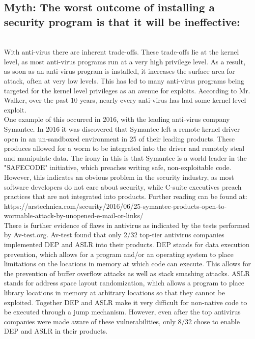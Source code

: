 \documentclass{article}
\newcommand\tab[1][1cm]{\hspace*{#1}}
\begin{document}
\subsection{Myth: The worst outcome of installing a security program is that it will be ineffective:}
\\
\tab With anti-virus there are inherent trade-offs. These trade-offs lie at the kernel level, as most anti-virus programs run at a very high privilege level. As a result, as soon as an anti-virus program is installed, it increases the surface area for attack, often at very low levels. This has led to many anti-virus programs being targeted for the kernel level privileges as an avenue for exploits. According to Mr. Walker, over the past 10 years, nearly every anti-virus has had some kernel level exploit. 
\\
\tab One example of this occurred in 2016, with the leading anti-virus company Symantec. In 2016 it was discovered that Symantec left a remote kernel driver open in an un-sandboxed environment in 25 of their leading products. These produces allowed for a worm to be integrated into the driver and remotely steal and manipulate data. The irony in this is that Symantec is a world leader in the "SAFECODE" initiative, which preaches writing safe, non-exploitable code. However, this indicates an obvious problem in the security industry, as most software developers do not care about security, while C-suite executives preach practices that are not integrated into products. Further reading can be found at:
https://arstechnica.com/security/2016/06/25-symantec-products-open-to-wormable-attack-by-unopened-e-mail-or-links/
\\
\tab There is further evidence of flaws in antivirus as indicated by the tests performed by Av-test.org. Av-test found that only 2/32 top-tier antivirus companies implemented DEP and ASLR into their products. DEP stands for data execution prevention, which allows for a program and/or an operating system to place limitations on the locations in memory at which code can execute. This allows for the prevention of buffer overflow attacks as well as stack smashing attacks. ASLR stands for address space layout randomization, which allows a program to place library locations in memory at arbitrary locations so that they cannot be exploited. Together DEP and ASLR make it very difficult for non-native code to be executed through a jump mechanism. However, even after the top antivirus companies were made aware of these vulnerabilities, only 8/32 chose to enable DEP and ASLR in their products.
\end{document}
